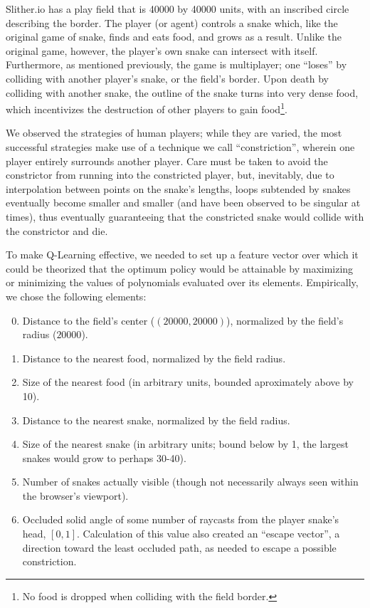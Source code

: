\documentclass{article}
\begin{document}
	Slither.io has a play field that is 40000 by 40000 units, with an inscribed
	circle describing the border. The player (or agent) controls a snake which,
	like the original game of snake, finds and eats food, and grows as a
	result. Unlike the original game, however, the player's own snake can
	intersect with itself. Furthermore, as mentioned previously, the game is
	multiplayer; one ``loses'' by colliding with another player's snake, or the
	field's border. Upon death by colliding with another snake, the outline of
	the snake turns into very dense food, which incentivizes the destruction of
	other players to gain food\footnote{No food is dropped when colliding with
	the field border.}.

	We observed the strategies of human players; while they are varied, the
	most successful strategies make use of a technique we call ``constriction'',
	wherein one player entirely surrounds another player. Care must be taken to
	avoid the constrictor from running into the constricted player, but,
	inevitably, due to interpolation between points on the snake's lengths,
	loops subtended by snakes eventually become smaller and smaller (and have
	been observed to be singular at times), thus eventually guaranteeing that
	the constricted snake would collide with the constrictor and die.
	
	To make Q-Learning effective, we needed to set up a feature vector over
	which it could be theorized that the optimum policy would be attainable by
	maximizing or minimizing the values of polynomials evaluated over its
	elements. Empirically, we chose the following elements:

	\begin{enumerate}
		\setcounter{enumi}{-1}
		\item Distance to the field's center ($(20000, 20000)$), normalized by
			the field's radius ($20000$).
		\item Distance to the nearest food, normalized by the field radius.
		\item Size of the nearest food (in arbitrary units, bounded
			aproximately above by 10).
		\item Distance to the nearest snake, normalized by the field radius.
		\item Size of the nearest snake (in arbitrary units; bound below by 1,
			the largest snakes would grow to perhaps 30-40).
		\item Number of snakes actually visible (though not necessarily always
			seen within the browser's viewport).
		\item Occluded solid angle of some number of raycasts from the player
			snake's head, $[0, 1]$. Calculation of this value also created an
			``escape vector'', a direction toward the least occluded path, as
			needed to escape a possible constriction.
	\end{enumerate}
\end{document}
